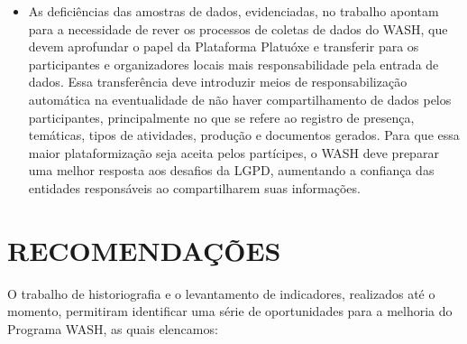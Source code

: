 \begin{itemize}
\item As deficiências das amostras de dados, evidenciadas, no trabalho apontam para a necessidade de rever os processos de coletas de dados do WASH, que devem aprofundar o papel da Plataforma Platuóxe e transferir para os participantes e organizadores locais mais responsabilidade pela entrada de dados. Essa transferência deve introduzir meios de responsabilização automática na eventualidade de não haver compartilhamento de dados pelos participantes, principalmente no que se refere ao registro de presença, temáticas, tipos de atividades, produção e documentos gerados. Para que essa maior plataformização seja aceita pelos partícipes, o WASH deve preparar uma melhor resposta aos desafios da LGPD, aumentando a confiança das entidades responsáveis ao compartilharem suas informações.
\end{itemize}

\chapter[RECOMENDAÇÕES]{RECOMENDAÇÕES}\label{RECOMENDAÇÕES}
O trabalho de historiografia e o levantamento de indicadores, realizados até o momento, permitiram identificar uma série de oportunidades para a melhoria do Programa WASH, as quais elencamos:


